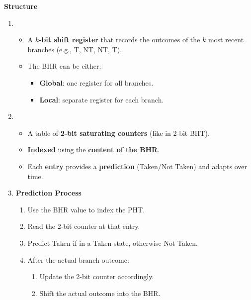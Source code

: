 \highspace
\begin{flushleft}
    \textcolor{Green3}{ \textbf{Structure}}
\end{flushleft}
\begin{enumerate}
    \item {}
    \begin{itemize}
        \item A \textbf{$k$-bit shift register} that records the outcomes of the $k$ most recent branches (e.g., T, NT, NT, T).
        \item The BHR can be either:
        \begin{itemize}
            \item \textbf{Global}: one register for all branches.
            \item \textbf{Local}: separate register for each branch.
        \end{itemize}
    \end{itemize}

    \item {}
    \begin{itemize}
        \item A table of \textbf{2-bit saturating counters} (like in 2-bit BHT).
        \item \textbf{Indexed} using the \textbf{content of the BHR}.
        \item Each \textbf{entry} provides a \textbf{prediction} (Taken/Not Taken) and adapts over time.
    \end{itemize}

    \item \textbf{Prediction Process}
    \begin{enumerate}
        \item Use the BHR value to index the PHT.
        \item Read the 2-bit counter at that entry.
        \item Predict Taken if in a Taken state, otherwise Not Taken.
        \item After the actual branch outcome:
        \begin{enumerate}
            \item Update the 2-bit counter accordingly.
            \item Shift the actual outcome into the BHR.
        \end{enumerate}
    \end{enumerate}
\end{enumerate}

